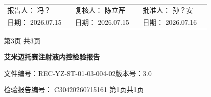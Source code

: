 \documentclass[UTF8,10pt,a4paper,fontset=fandol]{ctexart}
\newcommand{\fieldvalue}[1]{#1}
\newcommand{\handwritten}[1]{#1}
\begin{document}
\vspace{0.4em}

\begin{tabular}{p{0.30\linewidth}p{0.30\linewidth}p{0.30\linewidth}}
报告人：
\fieldvalue{\handwritten{冯？}}
&
复核人：
\fieldvalue{\handwritten{陈立芹}}
&
批准人：
\fieldvalue{\handwritten{孙？安}}
\\[1.5em]
日期：
\fieldvalue{\handwritten{2026.07.15}}
&
日期：
\fieldvalue{\handwritten{2026.07.15}}
&
日期：
\fieldvalue{\handwritten{2026.07.16}}
\end{tabular}

\begin{center}
第3页 共3页
\end{center}

\newpage

\begin{center}
\textbf{艾米迈托赛注射液内控检验报告}
\end{center}

\noindent
文件编号：REC-YZ-ST-01-03-004-02\hfill 版本号：3.0

\medskip

\noindent
检验报告编号：
\fieldvalue{C30420260715161}
\quad 第1页共1页

\medskip
\end{document}
